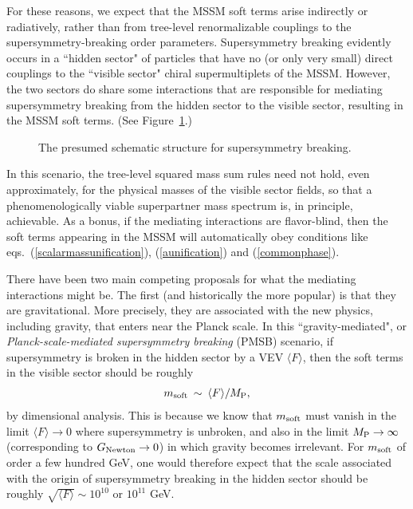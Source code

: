 \documentclass[11pt]{article}
\def\beq{\begin{eqnarray}}
\def\eeq{\end{eqnarray}}
\def\MPlanck{M_{\rm P}}
\begin{document}
For these reasons, we expect that the MSSM soft terms arise indirectly or
radiatively, rather than from tree-level renormalizable couplings to the
supersymmetry-breaking order parameters. Supersymmetry breaking evidently
occurs in a ``hidden sector" of particles that have no (or only very
small) direct couplings to the ``visible sector" chiral supermultiplets of
the MSSM. However, the two sectors do share some interactions that are
responsible for mediating supersymmetry breaking from the hidden sector to
the visible sector, resulting in the MSSM soft terms.
(See Figure~\ref{fig:structure}.)%
\begin{figure}
\centerline{}
\caption{The presumed schematic structure for supersymmetry breaking.
\label{fig:structure}}
\end{figure}
%
In this scenario, the tree-level squared 
mass sum rules need not hold, even approximately, for the physical masses 
of the visible sector fields, so that a phenomenologically viable 
superpartner mass spectrum is, in principle, achievable. As a bonus, if 
the mediating interactions are flavor-blind, then the soft terms appearing 
in the MSSM will automatically obey conditions like 
eqs.~(\ref{scalarmassunification}), (\ref{aunification}) and 
(\ref{commonphase}).

There have been two main competing proposals for what the mediating
interactions might be. The first (and historically the more popular) is
that they are gravitational. More precisely, they are associated with the
new physics, including gravity, that enters near the Planck scale. In this
``gravity-mediated", or {\it Planck-scale-mediated supersymmetry breaking}
(PMSB) scenario, if supersymmetry is broken in the hidden sector by a VEV
$\langle F\rangle$, then the soft terms in the visible sector should be
roughly
\beq
m_{\rm soft} \>\sim\> {\langle F \rangle / \MPlanck},
\label{mgravusual}
\eeq
by dimensional analysis. This is because we know that $m_{\rm soft}$ must
vanish in the limit $\langle F \rangle \rightarrow 0$ where supersymmetry
is unbroken, and also in the limit $\MPlanck \rightarrow \infty$
(corresponding to $G_{\rm Newton} \rightarrow 0$) in which gravity becomes
irrelevant. For $m_{\rm soft}$ of order a few hundred GeV, one would
therefore expect that the scale associated with the origin of
supersymmetry breaking in the hidden sector should be roughly
${\sqrt{\langle F\rangle}} \sim 10^{10}$ or $10^{11}$ GeV. 
\end{document}
